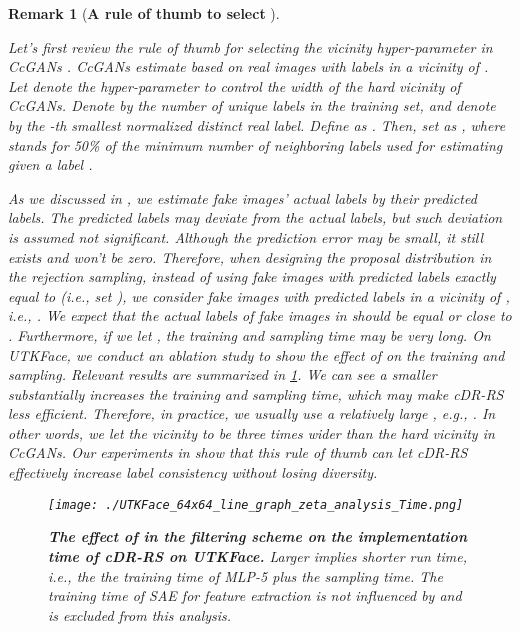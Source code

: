 \documentclass[final,12pt, 3p,times]{elsarticle}
\newtheorem{remark}{Remark}
\begin{document}
\begin{remark}[\textbf{A rule of thumb to select }]\label{rmk:rule_of_thumb_for_zeta}
    {\color{black}
    
    Let's first review the rule of thumb for selecting the vicinity hyper-parameter in CcGANs \cite{ding2021ccgan, ding2020continuous}. CcGANs estimate  based on real images with labels in a vicinity of . Let  denote the hyper-parameter to control the width of the hard vicinity of CcGANs. Denote by  the number of unique labels in the training set, and denote by  the -th smallest normalized distinct real label. Define  as . Then, \cite{ding2021ccgan, ding2020continuous} set  as , where  stands for 50\% of the minimum number of neighboring labels used for estimating  given a label . 
    
    As we discussed in , we estimate fake images' actual labels by their predicted labels. The predicted labels may deviate from the actual labels, but such deviation is assumed not significant. Although the prediction error may be small, it still exists and won't be zero. Therefore, when designing the proposal distribution in the rejection sampling, instead of using fake images with predicted labels exactly equal to  (i.e., set ), we consider fake images with predicted labels in a vicinity of , i.e., . We expect that the actual labels of fake images in  should be equal or close to . Furthermore, if we let , the training and sampling time may be very long. On UTKFace, we conduct an ablation study to show the effect of  on the training and sampling. Relevant results are summarized in \cref{fig:UTKFace_zeta_vs_total_time}. We can see a smaller  substantially increases the training and sampling time, which may make cDR-RS less efficient. Therefore, in practice, we usually use a relatively large , e.g., . In other words, we let the vicinity  to be three times wider than the hard vicinity in CcGANs. Our experiments in  show that this rule of thumb can let cDR-RS effectively increase label consistency without losing diversity.
    
    }
    






    
    \begin{figure}[!htbp]
    	\centering
    	\texttt{[image: ./UTKFace\_64x64\_line\_graph\_zeta\_analysis\_Time.png]}  \caption{\textbf{The effect of  in the filtering scheme on the implementation time of cDR-RS on UTKFace.} Larger  implies shorter run time, i.e., the the training time of MLP-5 plus the sampling time. The training time of SAE for feature extraction is not influenced by  and is excluded from this analysis.}
    	\label{fig:UTKFace_zeta_vs_total_time}
    \end{figure}
    
\end{remark}
\end{document}
